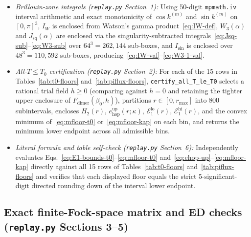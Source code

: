 \documentclass[11pt]{article}
\theoremstyle{definition}
\theoremstyle{remark}
\newcommand{\calE}{\mathcal{E}}
\begin{document}
\begin{itemize}[leftmargin=2em]
\item \emph{Brillouin-zone integrals (\texttt{replay.py} Section~1):} Using 50-digit \texttt{mpmath.iv} interval arithmetic and exact monotonicity of $\cos k^{(m)}$ and $\sin k^{(m)}$ on $[0, \pi]^3$, $I_W$ is enclosed from Watson's gamma product~\eqref{eq:IW-def}, $W_3(\alpha)$ and $J_{\mathrm{sq}}(\alpha)$ are enclosed via the singularity-subtracted integrals~\eqref{eq:Jsq-sub}--\eqref{eq:W3-sub} over $64^3 = 262{,}144$ sub-boxes, and $I_{\sin}$ is enclosed over $48^3 = 110{,}592$ sub-boxes, producing~\eqref{eq:IW-val}--\eqref{eq:W3-1-val}.
\item \emph{All-$T \le T_0$ certification (\texttt{replay.py} Section~2):} For each of the 15 rows in Tables~\ref{tab:t0-floors} and~\ref{tab:piflux-floors}, \texttt{certify\_all\_T\_le\_T0} selects a rational trial field $h \ge 0$ (comparing against $h = 0$ and retaining the tighter upper enclosure of $F_{\mathrm{dimer}}(\beta_0, h)$), partitions $r \in [0, r_{\max}]$ into $800$ subintervals, encloses $H_2(r)$, $e_{\mathrm{hop}}^{\mathrm{up}}(r; \kappa)$, $\calE_1^{\mathrm{lo}}(r)$, $\calE_1^{\mathrm{hi}}(r)$, and the convex minimum of~\eqref{eq:mfloor-t0} or~\eqref{eq:mfloor-kap} on each bin, and returns the minimum lower endpoint across all admissible bins.
\item \emph{Literal formula and table self-check (\texttt{replay.py} Section~6):} Independently evaluates Eqs.~\eqref{eq:E1-bounds-t0}--\eqref{eq:mfloor-t0} and~\eqref{eq:ehop-up}--\eqref{eq:mfloor-kap} directly against all 15 rows of Tables~\ref{tab:t0-floors} and~\ref{tab:piflux-floors} and verifies that each displayed floor equals the strict 5-significant-digit directed rounding down of the interval lower endpoint.
\end{itemize}

\subsection{Exact finite-Fock-space matrix and ED checks (\texttt{replay.py} Sections 3--5)}\label{app:ed}
\end{document}
